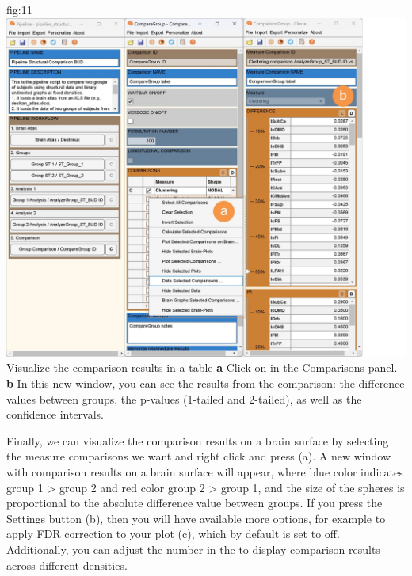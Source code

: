 \documentclass[justified]{tufte-handout}
\begin{document}
	{fig:11}
	{\includegraphics{fig11.jpg}}
	{Visualize the comparison results in a table}
	{
	{\bf a} Click on  in the Comparisons panel.
	{\bf b} In this new window, you can see the results from the comparison: the difference values between groups, the p-values (1-tailed and 2-tailed), as well as the confidence intervals.
	}
 
 
 \clearpage
 
Finally, we can visualize the comparison results on a brain surface by selecting the measure comparisons we want and right click and press  (a). A new window with comparison results on a brain surface will appear, where blue color indicates group 1 > group 2 and red color group 2 > group 1, and the size of the spheres is proportional to the absolute difference value between groups. If you press the Settings button (b), then you will have available more options, for example to apply FDR correction to your plot (c), which by default is set to off. Additionally, you can adjust the number in the  to display comparison results across different densities.
\end{document}

